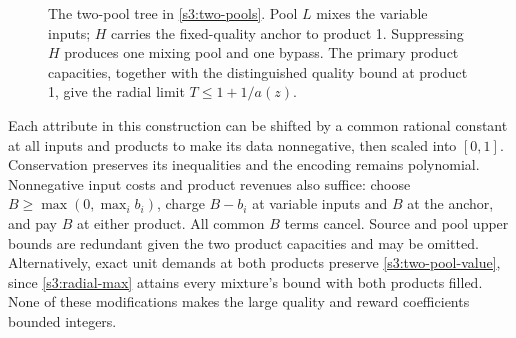 \begin{figure}[htbp]
\centering
{}
\caption{The two-pool tree in \cref{s3:two-pools}. Pool $L$ mixes the
variable inputs; $H$ carries the fixed-quality anchor to product 1.
Suppressing $H$ produces one mixing pool and one bypass. The primary
product capacities, together with the distinguished quality bound at
product 1, give the radial limit $T\le1+1/a(z)$.}
\label{s3:tree-figure}
\end{figure}

Each attribute in this construction can be shifted by a common rational
constant at all inputs and products to make its data nonnegative, then
scaled into $[0,1]$. Conservation preserves its inequalities and the
encoding remains polynomial. Nonnegative input costs and product revenues
also suffice: choose $B\ge\max(0,\max_i b_i)$, charge $B-b_i$ at
variable inputs and $B$ at the anchor, and pay $B$ at either product.
All common $B$ terms cancel. Source and pool upper bounds are redundant
given the two product capacities and may be omitted. Alternatively, exact
unit demands at both products preserve \eqref{s3:two-pool-value}, since
\eqref{s3:radial-max} attains every mixture's bound with both products
filled. None of these modifications makes the large quality and reward
coefficients bounded integers.

